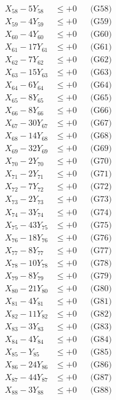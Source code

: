\documentclass[a4paper,10pt]{article}
\begin{document}
{\begin{align}
X_{58} - 5Y_{58} &\leq +0 && \text{(G58)} \\
X_{59} - 4Y_{59} &\leq +0 && \text{(G59)} \\
X_{60} - 4Y_{60} &\leq +0 && \text{(G60)} \\
X_{61} - 17Y_{61} &\leq +0 && \text{(G61)} \\
X_{62} - 7Y_{62} &\leq +0 && \text{(G62)} \\
X_{63} - 15Y_{63} &\leq +0 && \text{(G63)} \\
\allowbreak
X_{64} - 6Y_{64} &\leq +0 && \text{(G64)} \\
X_{65} - 8Y_{65} &\leq +0 && \text{(G65)} \\
X_{66} - 8Y_{66} &\leq +0 && \text{(G66)} \\
X_{67} - 30Y_{67} &\leq +0 && \text{(G67)} \\
X_{68} - 14Y_{68} &\leq +0 && \text{(G68)} \\
X_{69} - 32Y_{69} &\leq +0 && \text{(G69)} \\
X_{70} - 2Y_{70} &\leq +0 && \text{(G70)} \\
X_{71} - 2Y_{71} &\leq +0 && \text{(G71)} \\
X_{72} - 7Y_{72} &\leq +0 && \text{(G72)} \\
X_{73} - 2Y_{73} &\leq +0 && \text{(G73)} \\
\allowbreak
X_{74} - 3Y_{74} &\leq +0 && \text{(G74)} \\
X_{75} - 43Y_{75} &\leq +0 && \text{(G75)} \\
X_{76} - 18Y_{76} &\leq +0 && \text{(G76)} \\
X_{77} - 8Y_{77} &\leq +0 && \text{(G77)} \\
X_{78} - 10Y_{78} &\leq +0 && \text{(G78)} \\
X_{79} - 8Y_{79} &\leq +0 && \text{(G79)} \\
X_{80} - 21Y_{80} &\leq +0 && \text{(G80)} \\
X_{81} - 4Y_{81} &\leq +0 && \text{(G81)} \\
X_{82} - 11Y_{82} &\leq +0 && \text{(G82)} \\
X_{83} - 3Y_{83} &\leq +0 && \text{(G83)} \\
\allowbreak
X_{84} - 4Y_{84} &\leq +0 && \text{(G84)} \\
X_{85} - Y_{85} &\leq +0 && \text{(G85)} \\
X_{86} - 24Y_{86} &\leq +0 && \text{(G86)} \\
X_{87} - 44Y_{87} &\leq +0 && \text{(G87)} \\
X_{88} - 3Y_{88} &\leq +0 && \text{(G88)} \\

\end{align}}
\end{document}
